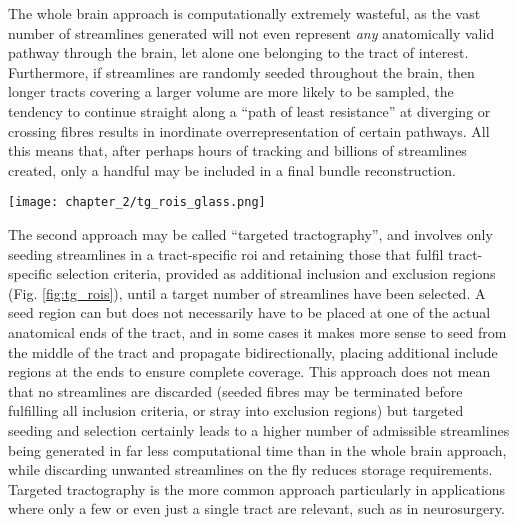 The whole brain approach is computationally extremely wasteful, as the vast number of streamlines generated will not even represent \textit{any} anatomically valid pathway through the brain, let alone one belonging to the tract of interest.
Furthermore, if streamlines are randomly seeded throughout the brain, then longer tracts covering a larger volume are more likely to be sampled, the tendency to continue straight along a ``path of least resistance'' at diverging or crossing fibres results in inordinate overrepresentation of certain pathways\autocite{Smith2013}.
All this means that, after perhaps hours of tracking and billions of streamlines created, only a handful may be included in a final bundle reconstruction.

\begin{SCfigure}
  \texttt{[image: chapter\_2/tg\_rois\_glass.png]}
  \caption{\Gls{wm} tracts are virtually dissected with streamline tractography and anatomically informed \glspl{roi}. In this toy example, streamlines for the \gls{cst} are seeded in the cerebral peduncles (blue ring) and selected with an inclusion \gls{roi} in the posterior limb of the internal capsule (green ring). Streamlines following the paths of the \gls{cc} or cerebellar peduncles are excluded (red rings).}
  \label{fig:tg_rois}
\end{SCfigure}

The second approach may be called ``targeted tractography'', and involves only seeding streamlines in a tract-specific \gls{roi} and retaining those that fulfil tract-specific selection criteria, provided as additional inclusion and exclusion regions (Fig. \ref{fig:tg_rois}), until a target number of streamlines have been selected.
A seed region can but does not necessarily have to be placed at one of the actual anatomical ends of the tract, and in some cases it makes more sense to seed from the middle of the tract and propagate bidirectionally, placing additional include regions at the ends to ensure complete coverage.
This approach does not mean that no streamlines are discarded (seeded fibres may be terminated before fulfilling all inclusion criteria, or stray into exclusion regions) but targeted seeding and selection certainly leads to a higher number of admissible streamlines being generated in far less computational time than in the whole brain approach, while discarding unwanted streamlines on the fly reduces storage requirements.
Targeted tractography is the more common approach particularly in applications where only a few or even just a single tract are relevant, such as in neurosurgery\autocite{Yang2021}.

